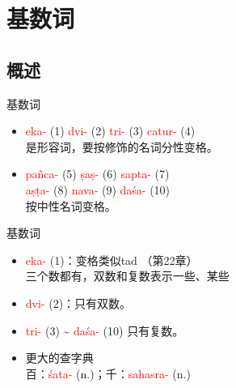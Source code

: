 \documentclass[17pt]{beamer}
\newcommand{\nounstem}[1]{\textcolor{red}{#1\nobreakdash-}}
\begin{document}
\section{基数词}
\begin{frame}{\insertsection}
  \small
  \tableofcontents[currentsection]
\end{frame}

\subsection{概述}
\begin{frame}{基数词 \insertsubsection}
  \small
  \begin{itemize}
    \item \nounstem{eka} (1) \nounstem{dvi} (2) 
    \nounstem{tri} (3) \nounstem{catur} (4) \\
    是形容词，要按修饰的名词分性变格。
    \item \nounstem{pañca} (5) \nounstem{ṣaṣ} (6) \nounstem{sapta} (7) \\
    \nounstem{aṣṭa} (8) \nounstem{nava} (9) \nounstem{daśa} (10)\\
    按中性名词变格。
  \end{itemize}
\end{frame}

\begin{frame}{基数词 \insertsubsection}
  \small
  \begin{itemize}
    \item \nounstem{eka} (1)：变格类似tad （第22章）
    \\ 三个数都有，双数和复数表示一些、某些
    \item \nounstem{dvi} (2)：只有双数。
    \item \nounstem{tri} (3) \textasciitilde{} \nounstem{daśa} (10) 只有复数。

    \item 更大的查字典\\百：\nounstem{śata} (n.)；千：\nounstem{sahasra} (n.)\\
  \end{itemize}
\end{frame}
\end{document}
